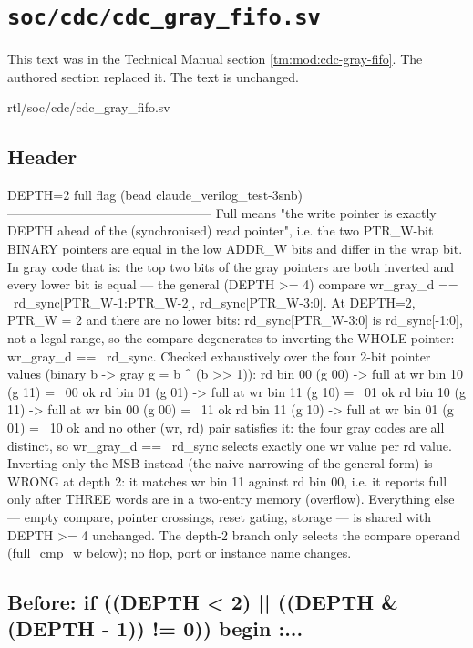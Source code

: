 \section{\texttt{soc/cdc/cdc\_gray\_fifo.sv}}\label{cr:arc:tm-cdc-gray-fifo}

This text was in the Technical Manual section \cref{tm:mod:cdc-gray-fifo}. The authored section replaced it. The text is unchanged.

\begin{relocated}{rtl/soc/cdc/cdc_gray_fifo.sv}

\subsection*{Header}

\begin{textblock}
DEPTH=2 full flag (bead claude_verilog_test-3snb)
------------------------------------------------
Full means "the write pointer is exactly DEPTH ahead of the (synchronised)
read pointer", i.e. the two PTR_W-bit BINARY pointers are equal in the low
ADDR_W bits and differ in the wrap bit. In gray code that is: the top two
bits of the gray pointers are both inverted and every lower bit is equal —
the general (DEPTH >= 4) compare
    wr_gray_d == {~rd_sync[PTR_W-1:PTR_W-2], rd_sync[PTR_W-3:0]}.
At DEPTH=2, PTR_W = 2 and there are no lower bits: rd_sync[PTR_W-3:0] is
rd_sync[-1:0], not a legal range, so the compare degenerates to inverting the
WHOLE pointer:  wr_gray_d == ~rd_sync.  Checked exhaustively over the four
2-bit pointer values (binary b -> gray g = b ^ (b >> 1)):
    rd bin 00 (g 00) -> full at wr bin 10 (g 11) = ~00   ok
    rd bin 01 (g 01) -> full at wr bin 11 (g 10) = ~01   ok
    rd bin 10 (g 11) -> full at wr bin 00 (g 00) = ~11   ok
    rd bin 11 (g 10) -> full at wr bin 01 (g 01) = ~10   ok
and no other (wr, rd) pair satisfies it: the four gray codes are all
distinct, so wr_gray_d == ~rd_sync selects exactly one wr value per rd value.
Inverting only the MSB instead (the naive narrowing of the general form) is
WRONG at depth 2: it matches wr bin 11 against rd bin 00, i.e. it reports
full only after THREE words are in a two-entry memory (overflow).
Everything else — empty compare, pointer crossings, reset gating, storage —
is shared with DEPTH >= 4 unchanged. The depth-2 branch only selects the
compare operand (full_cmp_w below); no flop, port or instance name changes.
\end{textblock}

\subsection*{Before: if ((DEPTH < 2) || ((DEPTH \& (DEPTH - 1)) != 0)) begin :...}


\end{relocated}
